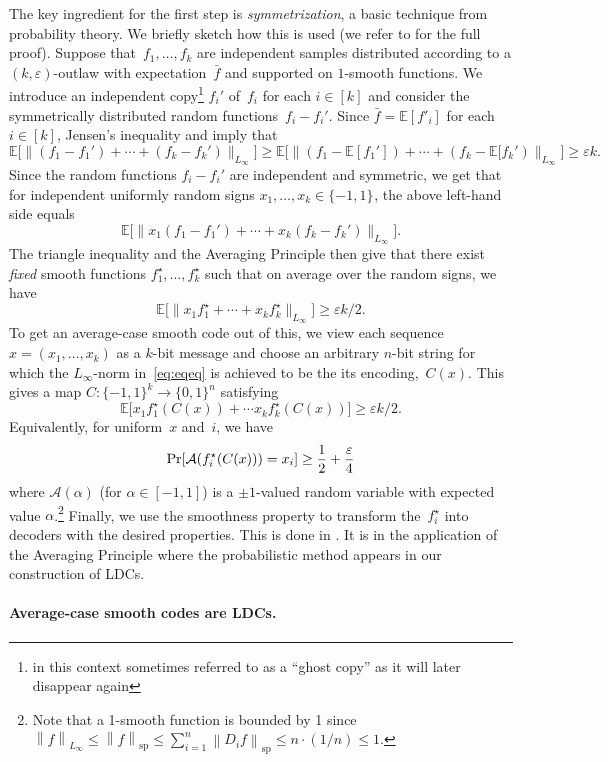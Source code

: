 \documentclass{toc}
\newcommand{\bset}[1]{\{0,1\}^{#1}} %
\newcommand{\pmset}[1]{\{-1,1\}^{#1}} %
\newcommand{\Exp}{{\mathbb{E}}}
\newcommand{\specnorm}[1]{\left\lVert #1 \right\rVert_{\mathrm{sp}}}
\newcommand{\norm}[1]{\left\lVert #1\right\rVert}
\newcommand{\eps}{\varepsilon}
\renewcommand{\Pr}{\mbox{\rm Pr}}
\newcommand{\cA}{{\mathcal A}}
\newcommand{\beq}{\begin{equation}}
\newcommand{\eeq}{\end{equation}}
\newcommand{\beqn}{\begin{equation*}}
\newcommand{\eeqn}{\end{equation*}}
\begin{document}
The key ingredient for the first step is \emph{symmetrization}, a basic technique from probability theory.
We briefly sketch how this is used (we refer to  for the full proof).
Suppose that~$f_1,\dots,f_k$ are independent samples distributed according to a $(k,\eps)$-outlaw with expectation~$\bar f$ and supported on $1$-smooth functions.
We introduce an independent copy\footnote{in this context sometimes referred to as a ``ghost copy'' as it will later disappear again} $f_i'$  of~$f_i$ for each $i\in[k]$ and consider the symmetrically distributed random functions~$f_i - f_i'$.
Since $\bar f = \Exp[f'_i]$ for each $i\in[k]$, Jensen's inequality and  imply that
\beqn
\Exp\big[\|(f_1 - f_1') + \cdots + (f_k - f_k')\|_{L_\infty}\big]
\geq
\Exp\big[\|(f_1 - \Exp[f_1']) + \cdots + (f_k - \Exp[f_k')\|_{L_\infty}\big]
\geq \eps k.
\eeqn
Since the random functions $f_i  -f_i'$ are independent and symmetric, we get that for independent uniformly random signs $x_1,\dots, x_k\in\pmset{}$, the above left-hand side equals
\beqn
\Exp\big[\|x_1(f_1 - f_1') + \cdots + x_k(f_k - f_k')\|_{L_\infty}\big].
\eeqn
The triangle inequality and the Averaging Principle then give that there exist \emph{fixed} smooth functions $f_1^\star,\dots,f_k^\star$ such that on average over the random signs, we have
\beq\label{eq:eqeq}
\Exp\big[ \|x_1f_1^\star + \cdots + x_kf^\star_k\|_{L_\infty}\big] \geq \eps k/2.
\eeq
To get an average-case smooth code out of this, we view each sequence $x = (x_1,\dots,x_k)$ as a $k$-bit message and choose an arbitrary $n$-bit string for which the $L_\infty$-norm in~\eqref{eq:eqeq} is achieved to be the its encoding,~$C(x)$.
This gives a map $C:\pmset{k}\to\bset{n}$ satisfying
\beqn
\Exp\big[x_1f^\star_1(C(x)) + \cdots x_kf^\star_k(C(x))\big] \geq \eps k/2.
\eeqn
Equivalently, for uniform~$x$ and~$i$, we have
\[
  \Pr[\cA(f^\star_i(C(x))) = x_i] \geq \frac12+\frac\eps4
\]
where $\cA(\alpha)$ (for $\alpha\in [-1,1]$) is a $\pm 1$-valued
random variable with expected value $\alpha$.\footnote{Note that a
  1-smooth function is bounded by 1 since
  $\norm{f}_{L_\infty}\le \specnorm{f}\le \sum_{i=1}^n \specnorm{D_if}
  \le n\cdot ({1}/{n}) \le 1$.}  Finally, we use the smoothness
property to transform the~$f_i^\star$ into decoders with the desired
properties.  This is done in .
It is in the application of the Averaging Principle where the
probabilistic method appears in our construction of LDCs.  \medskip

\paragraph{Average-case smooth codes are LDCs.}
\end{document}
